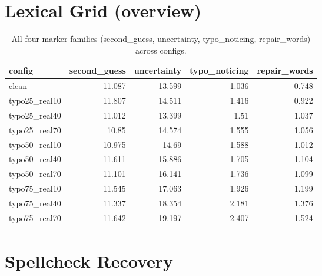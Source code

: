 \documentclass[11pt]{article}
\begin{document}
\section*{Lexical Grid (overview)}
\begin{table}[H]
\centering
\caption{All four marker families (second\_guess, uncertainty, typo\_noticing, repair\_words) across configs.}
\small
\begin{adjustbox}{max width=\textwidth}
\begin{tabular}{lrrrr}
\toprule
\textbf{config} & \textbf{second\_guess} & \textbf{uncertainty} & \textbf{typo\_noticing} & \textbf{repair\_words} \\
\midrule
clean & 11.087 & 13.599 & 1.036 & 0.748 \\
typo25\_real10 & 11.807 & 14.511 & 1.416 & 0.922 \\
typo25\_real40 & 11.012 & 13.399 & 1.51 & 1.037 \\
typo25\_real70 & 10.85 & 14.574 & 1.555 & 1.056 \\
typo50\_real10 & 10.975 & 14.69 & 1.588 & 1.012 \\
typo50\_real40 & 11.611 & 15.886 & 1.705 & 1.104 \\
typo50\_real70 & 11.101 & 16.141 & 1.736 & 1.099 \\
typo75\_real10 & 11.545 & 17.063 & 1.926 & 1.199 \\
typo75\_real40 & 11.337 & 18.354 & 2.181 & 1.376 \\
typo75\_real70 & 11.642 & 19.197 & 2.407 & 1.524 \\
\bottomrule
\end{tabular}
\end{adjustbox}
\end{table}

\section*{Spellcheck Recovery}

\end{document}
